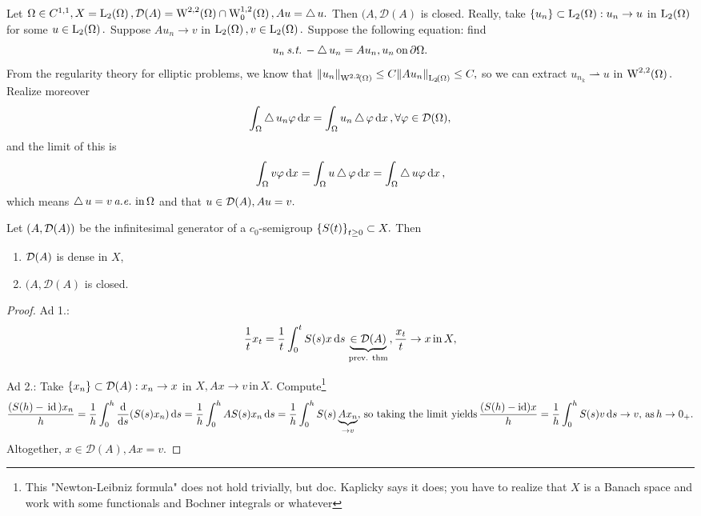\documentclass{article}
\begin{document}
\begin{example}
	Let $ \Omega \in C^{1,1}, X = \LpSet[2]{\Omega}, \mathcal{D}\qty(A) = \WkpSet[2][2]{\Omega} \cap \WkpzeroSet[1][2]{\Omega}, Au = \laplace u.$ Then $(A, \mathcal{D}(A)$ is closed. Really, take $\qty{u_n} \subset \LpSet[2]{\Omega}: u_n \to u$ in $\LpSet[2]{\Omega}$ for some $u \in \LpSet[2]{\Omega}.$ Suppose $Au_n \to v$ in $\LpSet[2]{\Omega}, v \in \LpSet[2]{\Omega}.$ 
	Suppose the following equation: find
	\[
		u_n \, \text{\textit{s.t.}} \, -\operatorname{\bigtriangleup} u_n = Au_n, u_n \, \text{on} \, \partial \Omega.
	\]
	From the regularity theory for elliptic problems, we know that $\norm{u_n}_{\WkpSet[2][2]{\Omega}} \leq C \norm{Au_n}_{\LpSet[2]{\Omega}} \leq C,$ so we can extract $u_{n_k} \rightharpoonup u$ in $\WkpSet[2][2]{\Omega}.$ Realize moreover
	\[
		\int_{\Omega}\operatorname{\bigtriangleup} u_n \varphi \dd{x} = \int_{\Omega}u_n \operatorname{\bigtriangleup} \varphi\dd{x}, \forall \varphi \in \mathcal{D}\qty(\Omega),
	\]
	and the limit of this is
	\[
		\int_{\Omega}v \varphi\dd{x} = \int_{\Omega}u \operatorname{\bigtriangleup} \varphi\dd{x} = \int_{\Omega} \operatorname{\bigtriangleup} u \varphi\dd{x},
	\]
	which means $\operatorname{\bigtriangleup} u = v \, \text{\textit{a.e.}} \, \, \text{in} \, \Omega$ and that $u \in \mathcal{D}\qty(A), Au = v.$
\end{example}

\begin{theorem}
	Let $\qty(A, \mathcal{D}\qty(A))$ be the infinitesimal generator of a $c_0$-semigroup $\qty{S(t)}_{t\geq 0} \subset X.$ Then

	\begin{enumerate}
		\item $\mathcal{D}\qty(A)$ is dense in $X$,
		\item $(A, \mathcal{D}(A)$ is closed.
	\end{enumerate}
\end{theorem}

\begin{proof}
	Ad 1.:
	\[
	\frac{1}{t}x_t = \frac{1}{t}\int_0^t S(s)x \dd{s} \underbrace{\in \mathcal{D}\qty(A)}_{\, \text{prev. thm} \,}, \frac{x_t}{t}\to x \, \text{in} \,X,
	\]

	Ad 2.:
	Take $\qty{x_n} \subset \mathcal{D}(A): x_n \to x$ in $X, Ax \to v \, \text{in} \,X.$ Compute\footnote{This "Newton-Leibniz formula" does not hold trivially, but doc. Kaplicky says it does; you have to realize that $X$ is a Banach space and work with some functionals and Bochner integrals or whatever}
	\begin{equation*}
		\frac{\qty(S(h)-\, \text{id} \,)x_n}{h} = \frac{1}{h}\int_0^h \dv{s}\qty(S(s)x_n)\dd{s} = \frac{1}{h}\int_0^h AS(s)x_n \dd{s} = \frac{1}{h}\int_0^h S(s)\underbrace{Ax_n}_{\to v}, \, \text{so taking the limit yields} \, \frac{\qty(S(h)-\text{id})x}{h} =\frac{1}{h}\int_0^h S(s)v \dd{s} \to v, \, \text{as} \, h \to 0_+.
	\end{equation*}
	Altogether, $x \in \mathcal{D}(A), Ax = v.$	
\end{proof}
\end{document}
